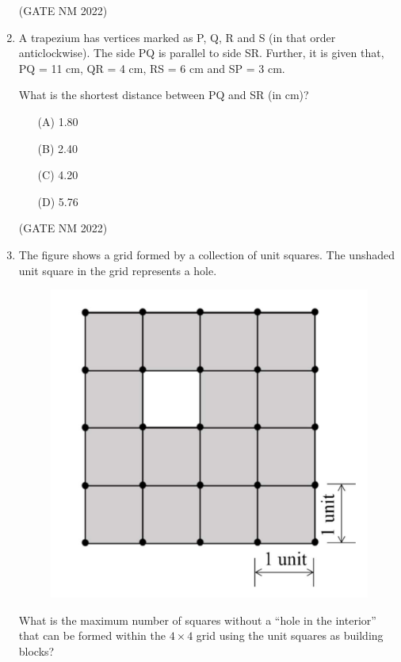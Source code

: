 \documentclass[journal,12pt,onecolumn]{IEEEtran}
\theoremstyle{remark}
\begin{document}
\begin{enumerate}
\hfill(GATE NM 2022)





\item  A trapezium has vertices marked as P, Q, R and S (in that order anticlockwise).  
The side PQ is parallel to side SR. Further, it is given that,  
PQ = 11 cm, QR = 4 cm, RS = 6 cm and SP = 3 cm.  

What is the shortest distance between PQ and SR (in cm)?\\[8pt]

\begin{multicols}{4}

\begin{enumerate}

	\item[(A)] 1.80 \\
	\item[(B)] 2.40 \\
	\item[(C)] 4.20 \\
	\item[(D)] 5.76 \\

\end{enumerate}

\end{multicols}

\hfill(GATE NM 2022)





\item  The figure shows a grid formed by a collection of unit squares. The unshaded unit square in the grid represents a hole.  

	

	\begin{figure}[h]
		\centering
	\includegraphics[width=0.2\columnwidth]{fig1}
	\caption{}
	\label{fig:placeholder}
	\end{figure}


What is the maximum number of squares without a ``hole in the interior'' that can be formed within the $4 \times 4$ grid using the unit squares as building blocks?  

\medskip


\end{enumerate}
\end{document}
